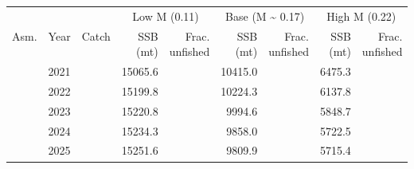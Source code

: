 \begin{table}
\centering
\begin{tabular}[t]{>{}l|l>{}rr>{}r|rrrr}
\toprule
\multicolumn{1}{c}{ } & \multicolumn{1}{c}{ } & \multicolumn{1}{c}{ } & \multicolumn{2}{c}{Low M (0.11)} & \multicolumn{2}{c}{Base (M \textasciitilde{} 0.17)} & \multicolumn{2}{c}{High M (0.22)} \\
\cmidrule(l{3pt}r{3pt}){4-5} \cmidrule(l{3pt}r{3pt}){6-7} \cmidrule(l{3pt}r{3pt}){8-9}
Asm. & Year & Catch & \makecell{SSB\\(mt)} & \makecell{Frac.\\unfished} & \makecell{SSB\\(mt)} & \makecell{Frac.\\unfished} & \makecell{SSB\\(mt)} & \makecell{Frac.\\unfished}\\
\midrule
 & 2021 & \cellcolor[HTML]{8A8779}{\textcolor{white}{700.0000}} & 15065.6 & \cellcolor[HTML]{46C06F}{\textcolor{white}{0.296}} & 10415.0 & \cellcolor[HTML]{24AA83}{\textcolor{white}{0.394}} & 6475.3 & \cellcolor[HTML]{20A386}{\textcolor{white}{0.419}}\\

 & 2022 & \cellcolor[HTML]{8A8779}{\textcolor{white}{700.0000}} & 15199.8 & \cellcolor[HTML]{44BF70}{\textcolor{white}{0.299}} & 10224.3 & \cellcolor[HTML]{25AB82}{\textcolor{white}{0.387}} & 6137.8 & \cellcolor[HTML]{23A983}{\textcolor{white}{0.397}}\\

 & 2023 & \cellcolor[HTML]{8A8779}{\textcolor{white}{700.0000}} & 15220.8 & \cellcolor[HTML]{44BF70}{\textcolor{white}{0.299}} & 9994.6 & \cellcolor[HTML]{27AD81}{\textcolor{white}{0.378}} & 5848.7 & \cellcolor[HTML]{27AD81}{\textcolor{white}{0.378}}\\

 & 2024 & \cellcolor[HTML]{8A8779}{\textcolor{white}{700.0000}} & 15234.3 & \cellcolor[HTML]{44BF70}{\textcolor{white}{0.299}} & 9858.0 & \cellcolor[HTML]{28AE80}{\textcolor{white}{0.373}} & 5722.5 & \cellcolor[HTML]{29AF7F}{\textcolor{white}{0.370}}\\

 & 2025 & \cellcolor[HTML]{8A8779}{\textcolor{white}{700.0000}} & 15251.6 & \cellcolor[HTML]{42BE71}{\textcolor{white}{0.300}} & 9809.9 & \cellcolor[HTML]{28AE80}{\textcolor{white}{0.371}} & 5715.4 & \cellcolor[HTML]{29AF7F}{\textcolor{white}{0.369}}\\


\end{tabular}
\end{table}
